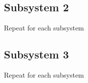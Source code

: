 \subsection{Subsystem 2}
Repeat for each subsystem

\subsection{Subsystem 3}
Repeat for each subsystem

